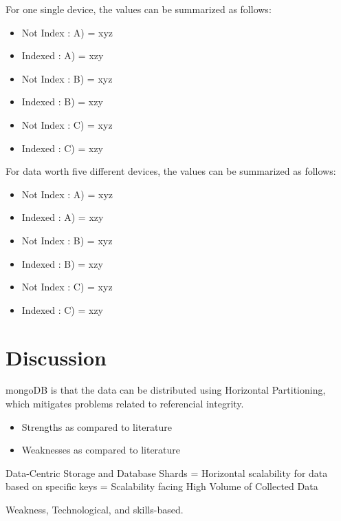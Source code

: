 For one single device, the values can be summarized as follows:

\begin{itemize}
  \item Not Index : A) = xyz
  \item Indexed : A) = xzy
  \item Not Index : B) = xyz
  \item Indexed : B) = xzy
  \item Not Index : C) = xyz
  \item Indexed : C) = xzy
\end{itemize}

For data worth five different devices, the values can be summarized as follows:

\begin{itemize}
  \item Not Index : A) = xyz
  \item Indexed : A) = xzy
  \item Not Index : B) = xyz
  \item Indexed : B) = xzy
  \item Not Index : C) = xyz
  \item Indexed : C) = xzy
\end{itemize}

\section{Discussion}

mongoDB is that the data can be distributed using Horizontal Partitioning,
which mitigates problems related to referencial integrity.

\begin{itemize}
  \item Strengths as compared to literature
  \item Weaknesses as compared to literature
\end{itemize}

Data-Centric Storage and Database Shards = Horizontal scalability for data
based on specific keys = Scalability facing High Volume of Collected Data

Weakness, Technological, and skills-based.